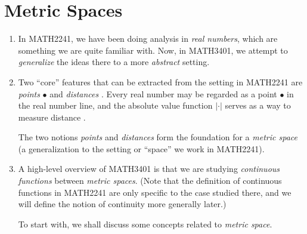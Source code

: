 \section{Metric Spaces}
\label{sect:metric-spaces}
\begin{enumerate}
\item In MATH2241, we have been doing analysis in \emph{real numbers}, which
are something we are quite familiar with. Now, in MATH3401, we attempt to
\emph{generalize} the ideas there to a more \emph{abstract} setting.

\item Two ``core'' features that can be extracted from the setting in MATH2241
are \emph{points} \(\bullet\) and \emph{distances} . Every real
number may be regarded as a point \(\bullet\) in the real number line, and the
absolute value function \(|\cdot|\) serves as a way to measure distance
.

The two notions \emph{points} and \emph{distances} form the foundation for a
\emph{metric space} (a generalization to the setting or ``space'' we work in
MATH2241).

\item A high-level overview of MATH3401 is that we are studying
\emph{continuous functions} between \emph{metric spaces}. (Note that the definition
of continuous functions in MATH2241 are only specific to the case studied
there, and we will define the notion of continuity more generally later.)

To start with, we shall discuss some concepts related to \emph{metric space}.
\end{enumerate}
